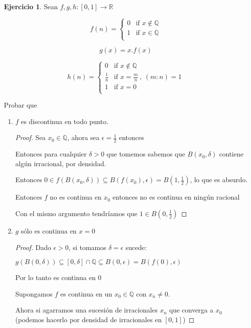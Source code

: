\documentclass[11pt]{report}
\newcommand{\Q}{\mathbb{Q}}
\newcommand{\R}{\mathbb{R}}
\newcommand{\ra}{\rightarrow}
\theoremstyle{definition}
\newtheorem{ej}{Ejercicio}
\begin{document}
	\begin{ej}
		Sean $f,g,h : [0,1] \ra \R$

		\[
 		 f(n) =
  			\begin{cases}
                                   0 & \text{if $x\notin \Q$} \\
                                   1 & \text{if $x\in \Q$} \\
  			\end{cases}
		\]

		$$g(x) = x.f(x)$$

		\[
 		 h(n) =
  			\begin{cases}
                                   0 & \text{if $x\notin \Q$} \\
				   \frac{1}{n} & \text{if $x =\frac{m}{n} \ , \ (m:n)=1$} \\
				   1 & \text{if $x =0$} \\
  			\end{cases}
		\]


		Probar que 

		\begin{enumerate}
			\item $f$ es discontinua en todo punto.
				\begin{proof}
					Sea $x_0 \in \Q$, ahora sea $\epsilon = \frac{1}{2}$ entonces 

					Entonces para cualquier $\delta >0$ que tomemos sabemos que $B(x_0,\delta)$ contiene algún irracional, por densidad.

					Entonces $0 \in f(B(x_0,\delta)) \subseteq B(f(x_0),\epsilon) = B(1,\frac{1}{2})$, lo que es absurdo.

					Entonces $f$ no es continua en $x_0$ entonces no es continua en ningún racional 

					Con el mismo argumento tendríamos que  $1 \in B(0,\frac{1}{2})$

				\end{proof}
			\item $g$ sólo es continua en $x=0$
				\begin{proof}
					Dado $\epsilon >0 $, si tomamos $\delta = \epsilon$ sucede:

					$ g(B(0,\delta)) \subseteq [0,\delta]  \cap \Q \subseteq B(0,\epsilon) = B(f(0),\epsilon) $

					Por lo tanto es continua en $0$

					Supongamos $f$ es continua en un $x_0 \in \Q$ con $x_n \neq 0$. 

					Ahora si agarramos una sucesión de irracionales $x_n$ que converga a $x_0$ (podemos hacerlo por densidad de irracionales en $[0,1]$)


\end{proof}
\end{enumerate}
\end{ej}
\end{document}
